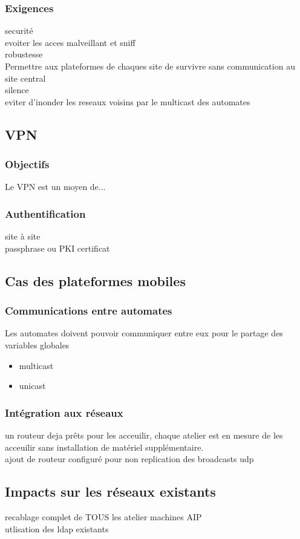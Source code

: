 
\subsubsection{Exigences}
securité\\
    evoiter les acces malveillant et sniff\\
robustesse\\
    Permettre aux plateformes de chaques site de survivre sans communication au site central\\
silence\\
    eviter d'inonder les reseaux voisins par le multicast des automates\\
\subsection{VPN}
\subsubsection{Objectifs}
Le VPN est un moyen de...\\


\subsubsection{Authentification}
site à site\\
passphrase ou PKI certificat


\subsection{Cas des plateformes mobiles}
\subsubsection{Communications entre automates}
Les automates doivent pouvoir communiquer entre eux pour le partage des variables globales

\begin{itemize}
	\item multicast
	\item unicast
\end{itemize}

\subsubsection{Intégration aux réseaux}
un routeur deja prêts pour les acceuilir, chaque atelier est en mesure de les acceuilir sans installation de matériel supplémentaire.\\
 ajout de routeur configuré pour non replication des broadcasts udp\\


\subsection{Impacts sur les réseaux existants}
recablage complet de TOUS les atelier machines AIP\\
utlisation des ldap existants


